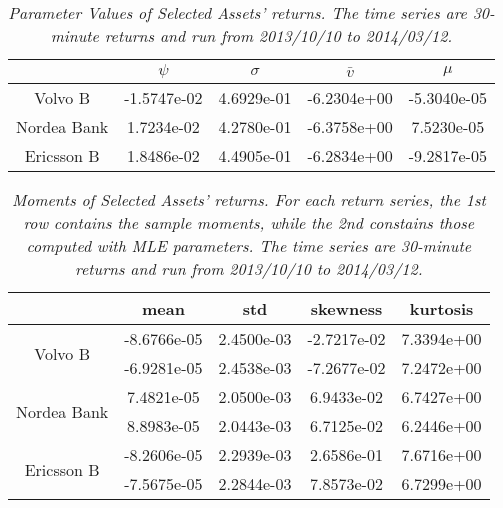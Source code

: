 \documentclass{report}
\begin{document}
\begin{table}[htb!]
  \centering
  \begin{tabular}{|c|c|c|c|c|}
    \hline
    & $\psi$ & $\sigma$ & $\bar{v}$ & $\mu$ \\
    \hline
    Volvo B & -1.5747e-02 & 4.6929e-01 & -6.2304e+00 &
    -5.3040e-05 \\
    Nordea Bank & 1.7234e-02 & 4.2780e-01 & -6.3758e+00 & 7.5230e-05
    \\
    Ericsson B & 1.8486e-02 & 4.4905e-01 & -6.2834e+00 & -9.2817e-05 \\
    \hline
  \end{tabular}
  \caption{\small \it Parameter Values of Selected Assets'
    returns. The time series are 30-minute returns and run from
    2013/10/10 to 2014/03/12.}
  \label{tab:assets_params}
\end{table}

\begin{table}[htb!]
  \centering
  \begin{tabular}{|c|c|c|c|c|}
    \hline
    & mean & std & skewness & kurtosis \\
    \hline
    \multirow{2}{*}{Volvo B} & -8.6766e-05 & 2.4500e-03 &
    -2.7217e-02 & 7.3394e+00 \\
    & -6.9281e-05 & 2.4538e-03 & -7.2677e-02 & 7.2472e+00 \\
    \hline
    \multirow{2}{*}{Nordea Bank} & 7.4821e-05 & 2.0500e-03 &
    6.9433e-02 & 6.7427e+00 \\
    & 8.8983e-05 & 2.0443e-03 & 6.7125e-02 & 6.2446e+00 \\
    \hline
    \multirow{2}{*}{Ericsson B} & -8.2606e-05 & 2.2939e-03 &
    2.6586e-01 & 7.6716e+00 \\
    & -7.5675e-05 & 2.2844e-03 & 7.8573e-02 & 6.7299e+00 \\
    \hline
  \end{tabular}
  \caption{\small \it Moments of Selected Assets' returns. For each return
    series, the 1st row contains the sample moments, while the 2nd
    constains those computed with MLE parameters. The time series are
    30-minute returns and run from 2013/10/10 to 2014/03/12.}
  \label{tab:assets_moments}
\end{table}



\end{document}
